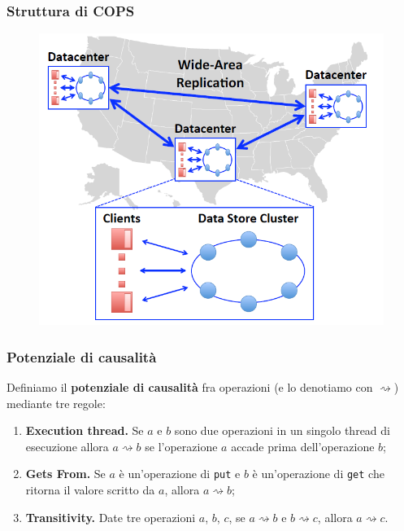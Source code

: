 \begin{frame}
\frametitle{Struttura di COPS}
	\begin{figure}
		\centering
		\includegraphics[scale=0.45]{COPS/COPS1.png}
	\end{figure}
\end{frame}

\begin{frame}
\frametitle{Potenziale di causalità}
	\begin{definizione}
	Definiamo il \textbf{potenziale di causalità} fra operazioni (e lo denotiamo con $\rightsquigarrow$)
	mediante tre regole:
	\begin{enumerate}
		\item<1-> \textbf{Execution thread.}
				  Se $a$ e $b$ sono due operazioni in un singolo thread di esecuzione
				  allora $a \rightsquigarrow b$ se l'operazione $a$ accade prima dell'operazione $b$;
		\item<1-> \textbf{Gets From.}
				  Se $a$ è un'operazione di \texttt{put} e $b$ è un'operazione di
				  \texttt{get} che ritorna il valore scritto da $a$, allora $a \rightsquigarrow b$;
		\item<1-> \textbf{Transitivity.}
				  Date tre operazioni $a$, $b$, $c$, se $a \rightsquigarrow b$ e $b 
				  \rightsquigarrow c$, allora $a \rightsquigarrow c$.
	\end{enumerate}
	\end{definizione}
\end{frame}

